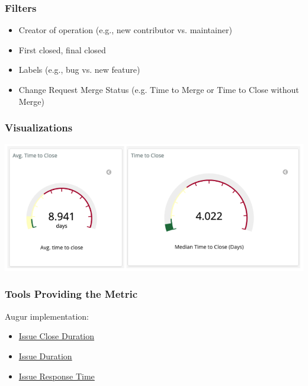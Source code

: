 \hypertarget{filters}{%
\subsubsection{Filters}\label{filters}}

\begin{itemize}
\tightlist
\item
  Creator of operation (e.g., new contributor vs. maintainer)
\item
  First closed, final closed
\item
  Labels (e.g., bug vs. new feature)
\item
  Change Request Merge Status (e.g. Time to Merge or Time to Close
  without Merge)
\end{itemize}

\hypertarget{visualizations}{%
\subsubsection{Visualizations}\label{visualizations}}

\includegraphics{images/time-to-close_1.png}

\hypertarget{tools-providing-the-metric}{%
\subsubsection{Tools Providing the
Metric}\label{tools-providing-the-metric}}

Augur implementation:

\begin{itemize}
\tightlist
\item
  \href{http://augur.osshealth.io/api_docs/\#api-Evolution-Closed_Issue_Resolution_Duration(Repo)}{Issue
  Close Duration}
\item
  \href{http://augur.osshealth.io/api_docs/\#api-Evolution-issue-duration-repo}{Issue
  Duration}
\item
  \href{http://augur.osshealth.io/api_docs/\#api-Evolution-Issue_Response_Time(Repo)}{Issue
  Response Time}
\end{itemize}

